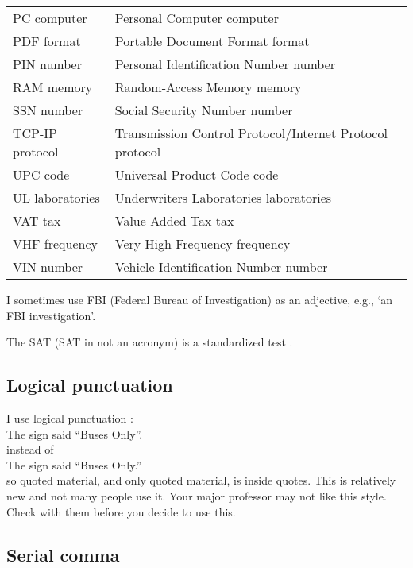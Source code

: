 {\begin{longtable}{@{}ll@{}}
    PC computer&          Personal Computer computer\\
    PDF format&           Portable Document Format format \cite{merriam-webster-pdf}\\
    PIN number&           Personal Identification Number number\\
    RAM memory&           Random-Access Memory memory\\
    SSN number&           Social Security Number number \cite{merriam-webster-ssn}\\
    TCP-IP protocol&      Transmission Control Protocol/Internet Protocol protocol\\  %
    UPC code&             Universal Product Code code\\
    UL laboratories&      Underwriters Laboratories laboratories\\
    VAT tax&              Value Added Tax tax\\
    VHF frequency&        Very High Frequency frequency\\
    VIN number&           Vehicle Identification Number number\\
  \end{longtable}
}

I sometimes use FBI
(Federal Bureau of Investigation)
as an adjective, e.g.,
`an FBI investigation'.

The SAT (SAT in not an acronym) is a standardized test
\cite{sat}.

\subsection{Logical punctuation}

I use logical punctuation
\cite{yagoda2011}:\\
   The sign said ``Buses Only''.\\
instead of\\
   The sign said ``Buses Only.''\\
so quoted material,
and only quoted material,
is inside quotes.
This is relatively new and not many people use it.
Your major professor may not like this style.
Check with them before you decide to use this.


\subsection{Serial comma}

